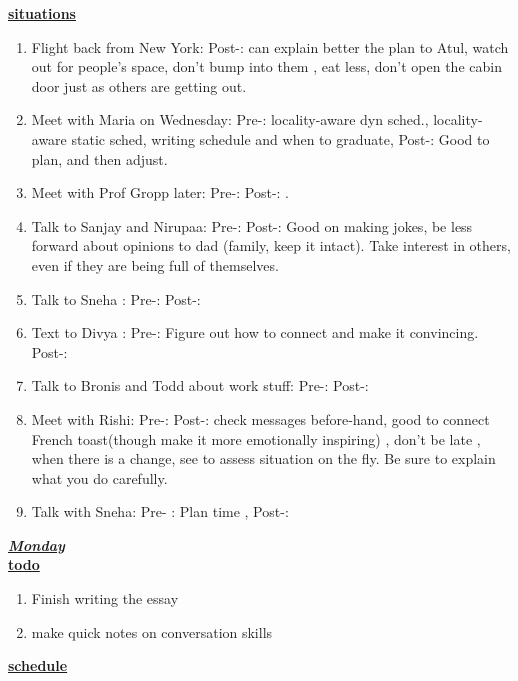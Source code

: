 \underline{\textbf{situations}} \\
\begin{enumerate}

\item Flight back from New York: Post-: can explain better the plan to Atul, watch out for people's space, don't bump into them , eat less, don't open the cabin door just as others are getting out.

\item Meet with Maria on Wednesday: Pre-: locality-aware dyn sched., locality-aware static sched, writing schedule and when to graduate,  Post-: Good to plan, and then adjust.
\item Meet with Prof Gropp later: Pre-:  Post-: .

\item Talk to Sanjay and Nirupaa: Pre-:  Post-: Good on making jokes, be less forward about opinions to dad (family, keep it intact). Take interest in others, even if they are being full of themselves.

\item Talk to Sneha : Pre-: Post-:
\item Text to Divya : Pre-: Figure out how to connect and make it convincing.  Post-:
\item Talk to Bronis and Todd about work stuff:  Pre-:  Post-:

\item Meet with Rishi: Pre-:  Post-:  check messages before-hand, good to connect French toast(though make it more emotionally inspiring) , don't be late , when there is a change, see to assess situation on the fly. Be sure to explain what you do carefully.

\item Talk with Sneha: Pre- : Plan time ,  Post-:

\end{enumerate}

\underline{\textbf{\textit{Monday}}}\\
\underline{\textbf{todo}}\\
\begin{enumerate}
\item Finish writing the essay 
\item make quick notes on conversation skills 
\end{enumerate}

\underline{\textbf{schedule}}\\
\begin{itemize}
\end{itemize}

